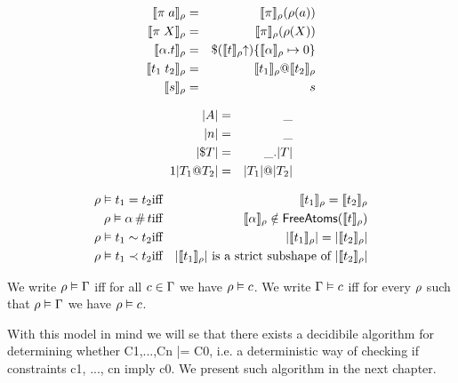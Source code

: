 \documentclass[english, mgr]{iithesis}
\begin{document}
\begin{eqnarray*}
  \llbracket \pi \; a \rrbracket_{\rho} & = &
    \llbracket \pi \rrbracket_{\rho}(\rho(a)) \\
  \llbracket \pi \; X \rrbracket_{\rho} & = &
    \llbracket \pi \rrbracket_{\rho}(\rho(X)) \\
  \llbracket \alpha. t \rrbracket_{\rho} & = &
    \$ (\llbracket t \rrbracket_{\rho} \kern-3pt \uparrow)
      \{\llbracket \alpha \rrbracket_{\rho}\mapsto0\} \\
  \llbracket t_1 \; t_2 \rrbracket_{\rho} & = &
    \llbracket t_1 \rrbracket_{\rho} @ \llbracket t_2 \rrbracket_{\rho} \\
  \llbracket s \rrbracket_{\rho} & = & s
\end{eqnarray*}

\begin{eqnarray*}
  |A|                     & = & \_ \\
  |n|                            & = & \_ \\
  |\$ T|             & = & \_. |T| \\1
  |T_1 @ T_2| & = &
    |T_1| @ |T_2|
\end{eqnarray*}

\begin{eqnarray*}
  \rho \vDash t_1 = t_2 & \textrm{iff} &
    \llbracket t_1 \rrbracket_{\rho} = \llbracket t_2 \rrbracket_{\rho} \\
  \rho \vDash \alpha \,\#\, t & \textrm{iff} &
    \llbracket \alpha \rrbracket_{\rho} \notin
      \mathsf{FreeAtoms}(\llbracket t \rrbracket_{\rho}) \\
  \rho \vDash t_1 \sim t_2 & \textrm{iff} &
    |\llbracket t_1 \rrbracket_{\rho}| = |\llbracket t_2 \rrbracket_{\rho}| \\
  \rho \vDash t_1 \prec t_2 & \textrm{iff} &
    |\llbracket t_1 \rrbracket_{\rho}| \textrm{ is a strict subshape of }
      |\llbracket t_2 \rrbracket_{\rho}|
\end{eqnarray*}

We write $\rho \vDash \Gamma$ iff for all $c \in \Gamma$
we have $\rho \vDash c$.
We write $\Gamma \vDash c$ iff
for every $\rho$ such that $\rho \vDash \Gamma$
we have $\rho \vDash c$.


With this model in mind we will se that there exists a decidibile algorithm
for determining whether C1,...,Cn |= C0,
i.e. a deterministic way of checking if constraints c1, ..., cn imply c0.
We present such algorithm in the next chapter.
\end{document}
